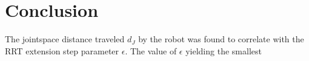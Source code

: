 \section{Conclusion} 
The jointspace distance traveled \(d_J\) by the robot was
found to correlate with the RRT extension step parameter \(\epsilon\).
The value of \(\epsilon\) yielding the smallest 